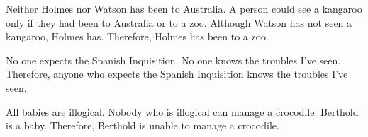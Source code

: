 \begin{compactlist}
\item Neither Holmes nor Watson has been to Australia. A person could see a kangaroo only if they had been to Australia or to a zoo. Although Watson has not seen a kangaroo, Holmes has. Therefore, Holmes has been to a zoo.
\item No one expects the Spanish Inquisition. No one knows the troubles I've seen. Therefore, anyone who expects the Spanish Inquisition knows the troubles I've seen.
\item All babies are illogical. Nobody who is illogical can manage a crocodile. Berthold is a baby. Therefore, Berthold is unable to manage a crocodile.
\end{compactlist}

